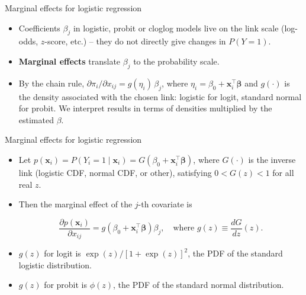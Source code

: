 \documentclass[10pt,ignorenonframetext,aspectratio=169]{beamer}
\newcommand{\bbeta}{\boldsymbol{\beta}}
\begin{document}
\begin{frame}{Marginal effects for logistic regression}
    \begin{itemize}
        \item Coefficients $\beta_j$ in logistic, probit or cloglog models live on the link scale (log-odds, $z$-score, etc.) -- they do not directly give changes in $P(Y=1)$.
        \item \textbf{Marginal effects} translate $\beta_j$ to the probability scale.
        \item By the chain rule, $\partial \pi_i/\partial x_{ij} = g(\eta_i)\,\beta_j$, where $\eta_i = \beta_0 + \mathbf{x}_i^\top\bbeta$ and $g(\cdot)$ is the density associated with the chosen link: logistic for logit, standard normal for probit. We interpret results in terms of densities multiplied by the estimated $\beta$.
    \end{itemize}
\end{frame}


\begin{frame}{Marginal effects for logistic regression}
\begin{itemize}
    \item Let $p(\mathbf{x}_i) = P(Y_i = 1 \mid \mathbf{x}_i) = G(\beta_0 + \mathbf{x}_i^\top\bbeta)$, where $G(\cdot)$ is the inverse link (logistic CDF, normal CDF, or other), satisfying $0 < G(z) < 1$ for all real $z$.
    \item Then the marginal effect of the $j$-th covariate is

    $$
    \frac{\partial p(\mathbf{x}_i)}{\partial x_{ij}} = g\!\left(\beta_0 + \mathbf{x}_i^\top\bbeta\right)\beta_j, \quad \text{where } g(z) \equiv \frac{dG}{dz}(z).
    $$
    \item $g(z)$ for logit is $\exp(z)/[1+\exp(z)]^2$, the PDF of the standard logistic distribution.
    \item $g(z)$ for probit is $\phi(z)$, the PDF of the standard normal distribution.
\end{itemize}
\end{frame}
\end{document}
